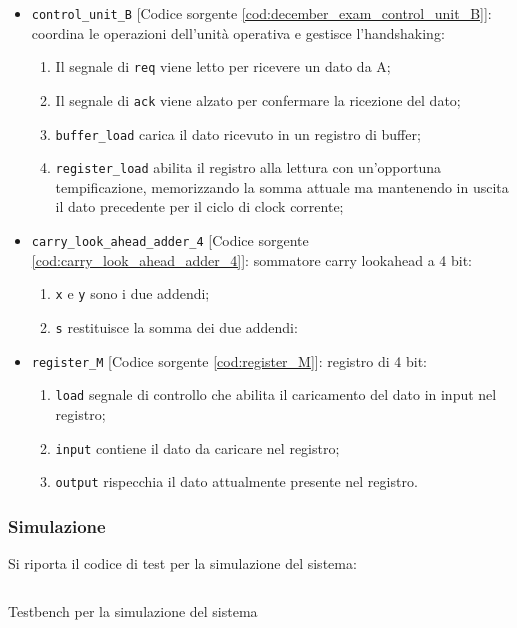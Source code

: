 \begin{itemize}
    \item \texttt{control\_unit\_B} [Codice sorgente \ref{cod:december_exam_control_unit_B}]: coordina le operazioni dell'unità operativa e gestisce l'handshaking:
    \begin{enumerate}
        \item Il segnale di \texttt{req} viene letto per ricevere un dato da A;
        \item Il segnale di \texttt{ack} viene alzato per confermare la ricezione del dato;
        \item \texttt{buffer\_load} carica il dato ricevuto in un registro di buffer;
        \item \texttt{register\_load} abilita il registro alla lettura con un'opportuna tempificazione, memorizzando la somma attuale ma mantenendo in uscita il dato precedente per il ciclo di clock corrente;
    \end{enumerate}
    \item \texttt{carry\_look\_ahead\_adder\_4} [Codice sorgente \ref{cod:carry_look_ahead_adder_4}]: sommatore carry lookahead a 4 bit:
    \begin{enumerate}
        \item \texttt{x} e \texttt{y} sono i due addendi;
        \item \texttt{s} restituisce la somma dei due addendi:
    \end{enumerate}
    \item \texttt{register\_M} [Codice sorgente \ref{cod:register_M}]: registro di 4 bit:
    \begin{enumerate}
        \item \texttt{load} segnale di controllo che abilita il caricamento del dato in input nel registro;
        \item \texttt{input} contiene il dato da caricare nel registro;
        \item \texttt{output} rispecchia il dato attualmente presente nel registro.
    \end{enumerate}
\end{itemize}

\subsubsection{Simulazione}
Si riporta il codice di test per la simulazione del sistema:

\begin{code}
    \inputminted{vhdl}{vhdl/december_exam_system_tb.vhd}
    \caption{Testbench per la simulazione del sistema}
    \label{cod:december_exam_system_tb}
\end{code}

